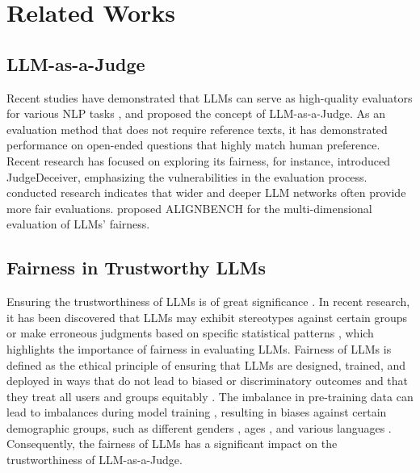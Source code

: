 \documentclass{article} %
\begin{document}



\appendix
\section{Related Works}
\label{appendix:related_work}
\subsection{LLM-as-a-Judge}
 Recent studies have demonstrated that LLMs can serve as high-quality evaluators for various NLP tasks \citep{ li2023prd, kasner2024traditionalbenchmarksanalyzingbehaviors, huang2024limitationsfinetunedjudgemodels, wang2023chatgptgoodnlgevaluator}, and \citet{zheng2024judging} proposed the concept of LLM-as-a-Judge. As an evaluation method that does not require reference texts, it has demonstrated performance on open-ended questions that highly match human preference. Recent research has focused on exploring its fairness, for instance, \citet{shi2024optimizationbasedpromptinjectionattack} introduced JudgeDeceiver, emphasizing the vulnerabilities in the evaluation process. \citet{zhang2023widerdeeperllmnetworks} conducted research indicates that wider and deeper LLM networks often provide more fair evaluations. \citet{liu2023alignbenchbenchmarkingchinesealignment} proposed ALIGNBENCH for the multi-dimensional evaluation of LLMs' fairness.

\subsection{Fairness in Trustworthy LLMs}
Ensuring the trustworthiness of LLMs is of great significance  \citet{liu2024trustworthyllmssurveyguideline, shi2024optimizationbasedpromptinjectionattack, huang2024obscurepromptjailbreakinglargelanguage, gao2024best, wu2024can}. In recent research, it has been discovered that LLMs may exhibit stereotypes against certain groups or make erroneous judgments based on specific statistical patterns \citep{Zhuo2023ExploringAE, Ferrara_2023, liu2024trustworthyllmssurveyguideline}, which highlights the importance of fairness in evaluating LLMs. Fairness of LLMs is defined as the ethical principle of ensuring that LLMs are designed, trained, and deployed in ways that do not lead to biased or discriminatory outcomes and that they treat all users and groups equitably \citep{sun2024trustllmtrustworthinesslargelanguage}. The imbalance in pre-training data can lead to imbalances during model training \citep{liu2024trustworthyllmssurveyguideline}, resulting in biases against certain demographic groups, such as different genders \citep{wan2023kellywarmpersonjoseph}, ages \citep{book}, and various languages \citep{jiao2023chatgptgoodtranslatoryes, bang2023multitaskmultilingualmultimodalevaluation}. Consequently, the fairness of LLMs has a significant impact on the trustworthiness of LLM-as-a-Judge.
\end{document}
